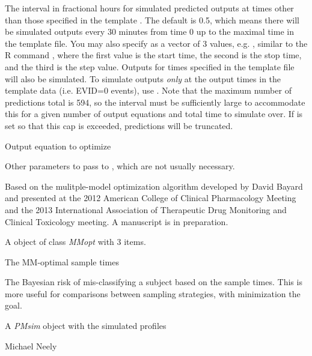 \documentclass[a4paper]{book}
\begin{document}
\begin{Arguments}
\begin{ldescription}
\item[\code{predInt}] The interval in fractional hours for simulated predicted outputs at times other than those specified in the template .
The default is 0.5, which means there will be simulated outputs every 30 minutes from time 0 up 
to the maximal time in the template file.  You may also specify 
as a vector of 3 values, e.g. , similar to the R command , where the
first value is the start time, the second is the stop time, and the third is the
step value.  Outputs for times specified in the template file will also be simulated.
To simulate outputs \emph{only} at the output times in the template data (i.e. EVID=0 events), use .
Note that the maximum number of predictions total is 594, so the interval must be sufficiently large to accommodate this for a given
number of output equations and total time to simulate over.  If  is set so that this cap is exceeded, predictions will be truncated.

\item[\code{outeq}] Output equation to optimize

\item[\code{...}] Other parameters to pass to , which are not usually necessary.
\end{ldescription}
\end{Arguments}
%
\begin{Details}\relax
Based on the mulitple-model optimization algorithm developed by David Bayard and presented at the 2012 American
College of Clinical Pharmacology Meeting and the 2013 International Association of Therapeutic
Drug Monitoring and Clinical Toxicology meeting.  A manuscript is in preparation.
\end{Details}
%
\begin{Value}
A object of class \emph{MMopt} with 3 items.
\begin{ldescription}
\item[\code{sampleTime }] The MM-optimal sample times
\item[\code{bayesRisk }] The Bayesian risk of mis-classifying a subject based on the sample times.  This
is more useful for comparisons between sampling strategies, with minimization the goal.
\item[\code{simdata }] A \emph{PMsim} object with the simulated profiles
\end{ldescription}
\end{Value}
%
\begin{Author}\relax
Michael Neely
\end{Author}
\end{document}

